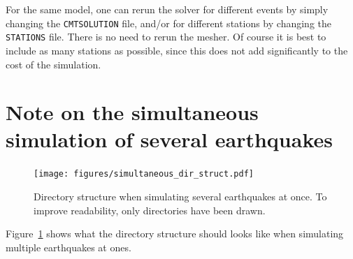 For the same model, one can rerun the solver for different events
by simply changing the \texttt{CMTSOLUTION} file, and/or for different
stations by changing the \texttt{STATIONS} file. There is no need
to rerun the mesher. Of course it is best to include as many stations
as possible, since this does not add significantly to the cost of
the simulation.



\section{Note on the simultaneous simulation of several earthquakes}

\begin{figure}[H]
\begin{centering}
\texttt{[image: figures/simultaneous\_dir\_struct.pdf]}
\par\end{centering}
%
\caption{
Directory structure when simulating several earthquakes at once.
To improve readability, only directories have been drawn.}
\label{fig:simultaneous_dir_struct}
\end{figure}

Figure~\ref{fig:simultaneous_dir_struct} shows what the directory structure
should looks like when simulating multiple earthquakes at ones.

